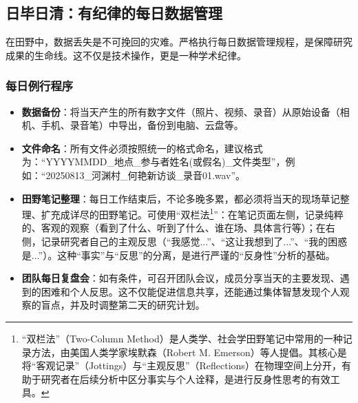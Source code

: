 \documentclass[UTF8]{ctexart}
\begin{document}
\subsection{日毕日清：有纪律的每日数据管理}
在田野中，数据丢失是不可挽回的灾难。严格执行每日数据管理规程，是保障研究成果的生命线。这不仅是技术操作，更是一种学术纪律。
\subsubsection{每日例行程序}
\begin{itemize}
    \item \textbf{数据备份}：将当天产生的所有数字文件（照片、视频、录音）从原始设备（相机、手机、录音笔）中导出，备份到电脑、云盘等。
    \item \textbf{文件命名}：所有文件必须按照统一的格式命名，建议格式为：“YYYYMMDD\_地点\_参与者姓名(或假名)\_文件类型”，例如：“20250813\_河渊村\_何艳新访谈\_录音01.wav”。
    \item \textbf{田野笔记整理}：每日工作结束后，不论多晚多累，都必须将当天的现场草记整理、扩充成详尽的田野笔记。可使用“双栏法\footnote[2]{“双栏法”（Two-Column Method）是人类学、社会学田野笔记中常用的一种记录方法，由美国人类学家埃默森（Robert M. Emerson）等人提倡。其核心是将“客观记录”（Jottings）与“主观反思”（Reflections）在物理空间上分开，有助于研究者在后续分析中区分事实与个人诠释，是进行反身性思考的有效工具。}”：在笔记页面左侧，记录纯粹的、客观的观察（看到了什么、听到了什么、谁在场、具体言行等）；在右侧，记录研究者自己的主观反思（“我感觉...”、“这让我想到了...”、“我的困惑是...”）。这种“事实”与“反思”的分离，是进行严谨的“反身性”分析的基础。
    \item \textbf{团队每日复盘会}：如有条件，可召开团队会议，成员分享当天的主要发现、遇到的困难和个人反思。这不仅能促进信息共享，还能通过集体智慧发现个人观察的盲点，并及时调整第二天的研究计划。
\end{itemize}
\end{document}
